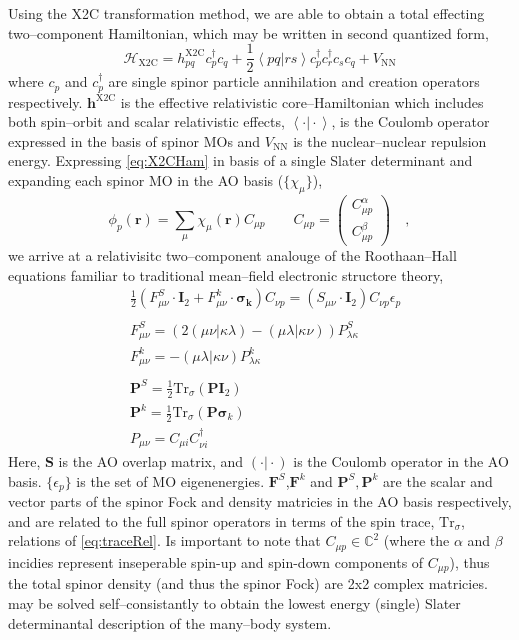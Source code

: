 \documentclass[12pt]{article}
\newcommand{\inner}[2]{\left\langle #1 \left\vert\right. #2 \right\rangle}            %
\newcommand*\vc[1]{\boldsymbol{#1}}
\begin{document}
Using the X2C transformation method, we are able to obtain a total effecting
two--component Hamiltonian, which may be written in second quantized form,
\begin{equation}
\mathscr{H}_\mathrm{X2C} = h_{pq}^\mathrm{X2C}c_p^\dagger c_q + 
  \frac{1}{2} \inner{pq}{rs} c_p^\dagger c_r^\dagger c_s c_q + V_\mathrm{NN}
  \label{eq:X2CHam}
\end{equation}
where $c_p$ and $c_p^\dagger$ are single spinor particle annihilation and
creation operators respectively. $\vc{h}^\mathrm{X2C}$ is the effective
relativistic core--Hamiltonian which includes both spin--orbit and scalar
relativistic effects, $\inner{\cdot}{\cdot}$, is the Coulomb operator expressed
in the basis of spinor MOs and $V_\mathrm{NN}$ is the nuclear--nuclear repulsion
energy. Expressing \cref{eq:X2CHam} in basis of a single Slater determinant and
expanding each spinor MO in the AO basis ($\lbrace \chi_\mu \rbrace$),
\begin{equation}
\phi_p ( \vc{r} ) = \sum_\mu \chi_\mu(\vc{r}) C_{\mu p}
\qquad
C_{\mu p} = \begin{pmatrix}
C_{\mu p}^\alpha \\ C_{\mu p}^\beta
\end{pmatrix}
\quad , \label{eq:AO2MO}
\end{equation}
we arrive at a relativisitc two--component analouge of the Roothaan--Hall
equations familiar to traditional mean--field electronic structore theory,
\begin{align}
&\frac{1}{2}\left(
  F^S_{\mu\nu} \cdot \vc{I}_2 + F^k_{\mu\nu} \cdot \vc{\sigma_k}
\right) C_{\nu p} = (S_{\mu\nu}\cdot \vc{I}_2) C_{\nu p}
\epsilon_p\label{eq:Roothaan}\\
\nonumber \\
&F^S_{\mu\nu} = \left(
  2\left( \mu\nu \vert \kappa\lambda \right) - 
  \left(  \mu\lambda \vert \kappa\nu \right) 
\right) P^S_{\lambda \kappa} \nonumber \\
&F^k_{\mu\nu} = -\left(  \mu\lambda \vert \kappa\nu \right) P^k_{\lambda \kappa}\\
\nonumber \\
&\vc{P}^S = \frac{1}{2}\mathrm{Tr}_\sigma (\vc{P}\vc{I}_2) \nonumber \\
&\vc{P}^k = \frac{1}{2}\mathrm{Tr}_\sigma (\vc{P}\vc{\sigma}_k)
\label{eq:traceRel}\\
&P_{\mu\nu} = C_{\mu i} C_{\nu i}^\dagger \nonumber
\end{align}
Here, $\vc{S}$ is the AO overlap matrix, and $(\cdot \vert \cdot)$ is the
Coulomb operator in the AO basis. $\{\epsilon_p\}$ is the set of MO
eigenenergies. $\vc{F}^S$,$\vc{F}^k$ and $\vc{P}^S,\vc{P}^k$ are the scalar and
vector parts of the spinor Fock and density matricies in the AO basis
respectively, and are related to the full spinor operators in terms of the spin
trace, $\mathrm{Tr}_\sigma$, relations of \cref{eq:traceRel}. Is important to
note that $C_{\mu p} \in \mathbb{C}^2$ (where the $\alpha$ and $\beta$ incidies
represent inseperable spin-up and spin-down components of $C_{\mu p}$), thus the
total spinor density (and thus the spinor Fock) are 2x2 complex matricies.
 may be solved self--consistantly to obtain the lowest energy
(single) Slater determinantal description of the many--body system.
\end{document}
